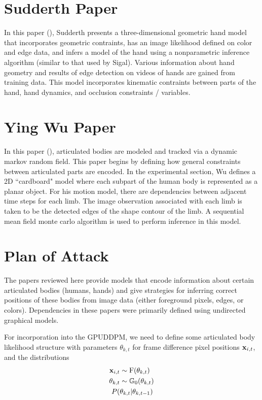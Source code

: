 \documentclass{article}
\begin{document}
\section{Sudderth Paper}

In this paper (\cite{Sudderth04distributedocclusion}), Sudderth presents a three-dimensional geometric hand model that incorporates geometric contraints, has an image likelihood defined on color and edge data, and infers a model of the hand using a nonparametric inference algorithm (similar to that used by Sigal). Various information about hand geometry and results of edge detection on videos of hands are gained from training data. This model incorporates kinematic contraints between parts of the hand, hand dynamics, and occlusion constraints / variables.


\section{Ying Wu Paper}

In this paper (\cite{wu2003tracking}), articulated bodies are modeled and tracked via a dynamic markov random field. This paper begins by defining how general constraints between articulated parts are encoded. In the experimental section, Wu defines a 2D ``cardboard" model where each subpart of the human body is represented as a planar object. For his motion model, there are dependencies between adjacent time steps for each limb. The image observation associated with each limb is taken to be the detected edges of the shape contour of the limb. A sequential mean field monte carlo algorithm is used to perform inference in this model.




\section{Plan of Attack}

The papers reviewed here provide models that encode information about certain articulated bodies (humans, hands) and give strategies for inferring correct positions of these bodies from image data (either foreground pixels, edges, or colors). Dependencies in these papers were primarily defined using undirected graphical models.

For incorporation into the GPUDDPM, we need to define some articulated body likelihood structure with parameters $\theta_{k,t}$ for frame difference pixel positions $\bold{x}_{i,t}$, and the distributions
\begin{equation}
\begin{split}
\bold{x}_{i,t} &\sim \text{F}(\theta_{k,t}) \\
\theta_{k,t} &\sim \mathbb{G}_{0}(\theta_{k,t}) \\
P(&\theta_{k,t} | \theta_{k,t-1})
\end{split}
\end{equation}
\end{document}
